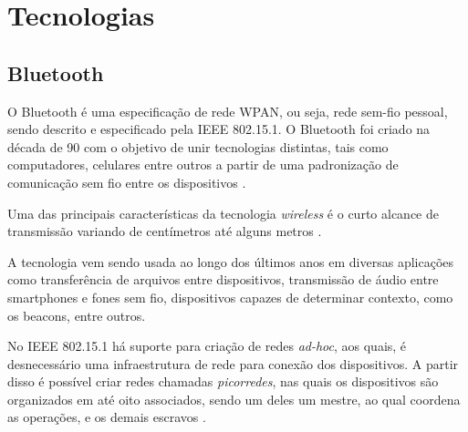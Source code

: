 \documentclass[
	article,			%
	11pt,				%
	oneside,			%
	a4paper,			%
	section=TITLE,		%
	subsection=TITLE,	%
	english,			%
	brazil,				%
	sumario=tradicional
	]{abntex2}
\begin{document}



\section{Tecnologias}









\subsection{Bluetooth}

O Bluetooth é uma especificação de rede WPAN, ou seja, rede sem-fio pessoal, sendo descrito e 
especificado pela IEEE 802.15.1. O Bluetooth foi criado na década de 90 com o objetivo de unir
tecnologias distintas, tais como computadores, celulares entre outros a partir de uma padronização 
de comunicação sem fio entre os dispositivos \cite{jimkardach2008}. 


Uma das principais características da tecnologia \textit{wireless} é o curto alcance de 
transmissão variando de centímetros até alguns metros \cite{huang2007bluetooth}. 

A tecnologia vem sendo usada ao longo dos últimos anos em diversas aplicações como transferência de 
arquivos entre dispositivos, transmissão de áudio entre smartphones e fones sem fio, dispositivos 
capazes de determinar contexto, como os beacons, entre outros.

No IEEE 802.15.1 há suporte para criação de redes \textit{ad-hoc}, aos quais, é desnecessário uma 
infraestrutura de rede para conexão dos dispositivos. A partir disso é possível criar redes 
chamadas \textit{picorredes}, nas quais os dispositivos são organizados em até oito associados, 
sendo um deles um mestre, ao qual coordena as operações, e os demais escravos 
\cite{bluetoothSIG2017}.
\end{document}
